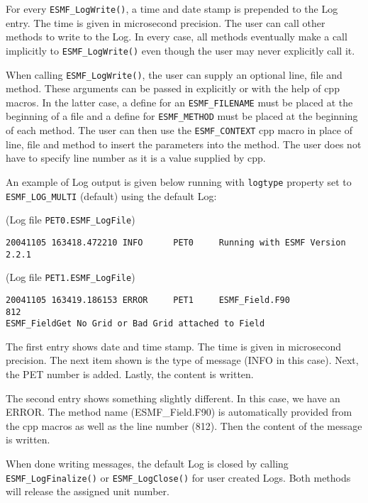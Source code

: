 For every {\tt ESMF\_LogWrite()}, a time and date stamp is prepended to the
Log entry.  The time is given in microsecond precision.  The user can call 
other methods to write to the Log.  In every case, all methods eventually make 
a call implicitly to {\tt ESMF\_LogWrite()} even though the user may never 
explicitly call it.

When calling {\tt ESMF\_LogWrite()}, the user can supply an optional line,
file and method.  These arguments can be passed in explicitly or with the help
of cpp macros.  In the latter case, a define for an {\tt ESMF\_FILENAME} must 
be placed at the beginning of a file and a define for {\tt ESMF\_METHOD} must
be placed at the beginning of each method.  The user can then use the
{\tt ESMF\_CONTEXT} cpp macro in place of line, file and method to insert the 
parameters into the method.  The user does not have to specify line number as
it is a value supplied by cpp.

An example of Log output is given below running with {\tt logtype} 
property set to {\tt ESMF\_LOG\_MULTI} (default) using the default Log:

(Log file {\tt PET0.ESMF\_LogFile})
\begin{verbatim}
20041105 163418.472210 INFO      PET0     Running with ESMF Version 2.2.1   
\end{verbatim}

(Log file {\tt PET1.ESMF\_LogFile})
\begin{verbatim}
20041105 163419.186153 ERROR     PET1     ESMF_Field.F90             812  
ESMF_FieldGet No Grid or Bad Grid attached to Field
\end{verbatim}

The first entry shows date and time stamp.  The time is given in microsecond 
precision.  The next item shown is the type of message (INFO in this case).  
Next, the PET number is added.  Lastly, the content is written.

\begin{sloppypar}
The second entry shows something slightly different.  In this case, we have
an ERROR.  The method name (ESMF\_Field.F90) is automatically provided from 
the cpp macros as well as the line number (812).  Then the content of the 
message is written.
\end{sloppypar}
 
When done writing messages, the default Log is closed by calling 
{\tt ESMF\_LogFinalize()}  or {\tt ESMF\_LogClose()} for user created Logs.  
Both methods will release the assigned unit number.
